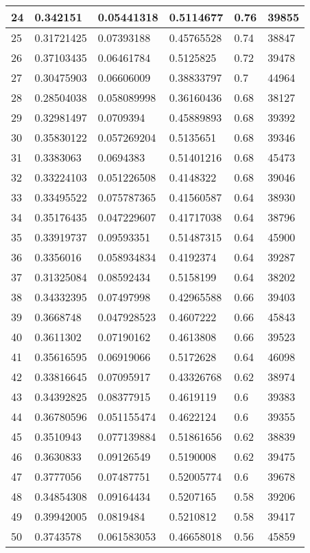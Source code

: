 \begin{longtable}{|l|l|l|l|l|l|}
24 & 0.342151 & 0.05441318 & 0.5114677 & 0.76 & 39855 \\ \hline 
25 & 0.31721425 & 0.07393188 & 0.45765528 & 0.74 & 38847 \\ \hline 
26 & 0.37103435 & 0.06461784 & 0.5125825 & 0.72 & 39478 \\ \hline 
27 & 0.30475903 & 0.06606009 & 0.38833797 & 0.7 & 44964 \\ \hline 
28 & 0.28504038 & 0.058089998 & 0.36160436 & 0.68 & 38127 \\ \hline 
29 & 0.32981497 & 0.0709394 & 0.45889893 & 0.68 & 39392 \\ \hline 
30 & 0.35830122 & 0.057269204 & 0.5135651 & 0.68 & 39346 \\ \hline 
31 & 0.3383063 & 0.0694383 & 0.51401216 & 0.68 & 45473 \\ \hline 
32 & 0.33224103 & 0.051226508 & 0.4148322 & 0.68 & 39046 \\ \hline 
33 & 0.33495522 & 0.075787365 & 0.41560587 & 0.64 & 38930 \\ \hline 
34 & 0.35176435 & 0.047229607 & 0.41717038 & 0.64 & 38796 \\ \hline 
35 & 0.33919737 & 0.09593351 & 0.51487315 & 0.64 & 45900 \\ \hline 
36 & 0.3356016 & 0.058934834 & 0.4192374 & 0.64 & 39287 \\ \hline 
37 & 0.31325084 & 0.08592434 & 0.5158199 & 0.64 & 38202 \\ \hline 
38 & 0.34332395 & 0.07497998 & 0.42965588 & 0.66 & 39403 \\ \hline 
39 & 0.3668748 & 0.047928523 & 0.4607222 & 0.66 & 45843 \\ \hline 
40 & 0.3611302 & 0.07190162 & 0.4613808 & 0.66 & 39523 \\ \hline 
41 & 0.35616595 & 0.06919066 & 0.5172628 & 0.64 & 46098 \\ \hline 
42 & 0.33816645 & 0.07095917 & 0.43326768 & 0.62 & 38974 \\ \hline 
43 & 0.34392825 & 0.08377915 & 0.4619119 & 0.6 & 39383 \\ \hline 
44 & 0.36780596 & 0.051155474 & 0.4622124 & 0.6 & 39355 \\ \hline 
45 & 0.3510943 & 0.077139884 & 0.51861656 & 0.62 & 38839 \\ \hline 
46 & 0.3630833 & 0.09126549 & 0.5190008 & 0.62 & 39475 \\ \hline 
47 & 0.3777056 & 0.07487751 & 0.52005774 & 0.6 & 39678 \\ \hline 
48 & 0.34854308 & 0.09164434 & 0.5207165 & 0.58 & 39206 \\ \hline 
49 & 0.39942005 & 0.0819484 & 0.5210812 & 0.58 & 39417 \\ \hline 
50 & 0.3743578 & 0.061583053 & 0.46658018 & 0.56 & 45859 \\ \hline 
\end{longtable}